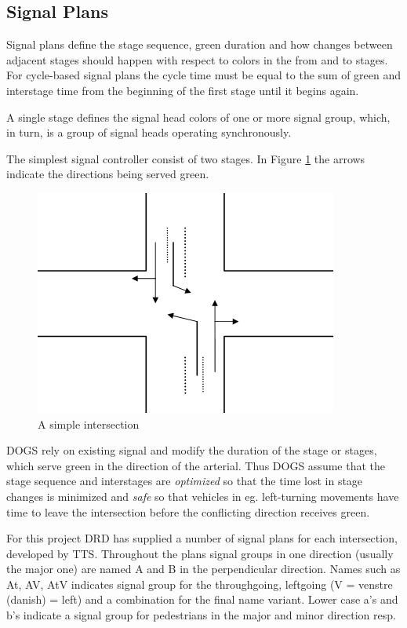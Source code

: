 \subsection{Signal Plans}
Signal plans define the stage sequence, green duration and how changes between adjacent stages should happen with respect to colors in the from and to stages. For cycle-based signal plans the cycle time must be equal to the sum of green and interstage time from the beginning of the first stage until it begins again.

A single stage defines the signal head colors of one or more signal group, which, in turn, is a group of signal heads operating synchronously.

The simplest signal controller consist of two stages. In  Figure \ref{fig:simple_intersection} the arrows indicate the directions being served green.

\begin{figure}[!ht]
\begin{center}
\includegraphics[scale=0.5]{simple_intersection.png} 
\end{center}
\caption{A simple intersection}
\label{fig:simple_intersection}
\end{figure}

DOGS rely on existing signal and modify the duration of the stage or stages, which serve green in the direction of the arterial. Thus DOGS assume that the stage sequence and interstages are \textit{optimized} so that the time lost in stage changes is minimized and \textit{safe} so that vehicles in eg. left-turning movements have time to leave the intersection before the conflicting direction receives green.

For this project DRD has supplied a number of signal plans for each intersection, developed by TTS. Throughout the plans signal groups in one direction (usually the major one) are named A and B in the perpendicular direction. Names such as At, AV, AtV indicates signal group for the throughgoing, leftgoing (V = venstre (danish) = left) and a combination for the final name variant. Lower case a's and b's indicate a signal group for pedestrians in the major and minor direction resp.

